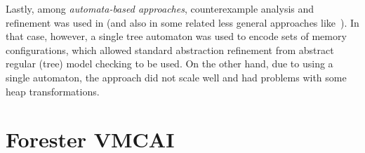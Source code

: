 {%

Lastly, among \emph{automata-based approaches}, counterexample analysis and
refinement was used in \cite{bhrv06b} (and also in some related less general
approaches like~\cite{bhmv05}). In that case, however, a single tree automaton
was used to encode sets of memory configurations, which allowed standard
abstraction refinement from abstract regular (tree) model checking
\cite{artmc} to be used. On the other hand, due to using a single automaton,
the approach did not scale well and had problems with some heap transformations.
 

\chapter{Forester VMCAI}
\label{ch:vmcai}
}
